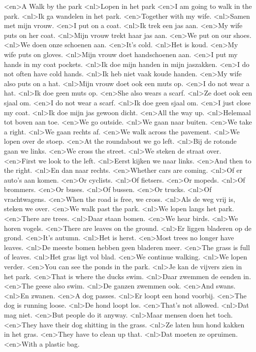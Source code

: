 <en>A Walk by the park
<nl>Lopen in het park
<en>I am going to walk in  the park.
<nl>Ik ga wandelen in het park.
<en>Together with my wife.
<nl>Samen met mijn vrouw.
<en>I put on a coat.
<nl>Ik trek een jas aan.
<en>My wife puts on her coat.
<nl>Mijn vrouw trekt haar jas aan.
<en>We put on our shoes.
<nl>We doen onze schoenen aan.
<en>It's cold.
<nl>Het is koud.
<en>My wife puts on gloves.
<nl>Mijn vrouw doet handschoenen aan.
<en>I put my hands in my coat pockets.
<nl>Ik doe mijn handen in mijn jaszakken.
<en>I do not often have cold hands.
<nl>Ik heb niet vaak koude handen.
<en>My wife also puts on a hat.
<nl>Mijn vrouw doet ook een muts op.
<en>I do not wear a hat.
<nl>Ik doe geen muts op.
<en>She also wears a scarf.
<nl>Ze doet ook een sjaal om.
<en>I do not wear a scarf.
<nl>Ik doe geen sjaal om.
<en>I just close my coat.
<nl>Ik doe mijn jas gewoon dicht.
<en>All the way up.
<nl>Helemaal tot boven aan toe.
<en>We go outside.
<nl>We gaan naar buiten.
<en>We take a right.
<nl>We gaan rechts af.
<en>We walk across the pavement.
<nl>We lopen over de stoep.
<en>At the roundabout we go left.
<nl>Bij de rotonde gaan we links.
<en>We cross the street.
<nl>We steken de straat over.
<en>First we look to the left.
<nl>Eerst kijken we naar links.
<en>And then to the right.
<nl>En dan naar rechts.
<en>Whether cars are coming.
<nl>Of er auto's aan komen.
<en>Or cyclists.
<nl>Of fietsers.
<en>Or mopeds.
<nl>Of brommers.
<en>Or buses.
<nl>Of bussen.
<en>Or trucks.
<nl>Of vrachtwagens.
<en>When the road is free, we cross.
<nl>Als de weg vrij is, steken we over.
<en>We walk past the park.
<nl>We lopen langs het park.
<en>There are trees.
<nl>Daar staan bomen.
<en>We hear birds.
<nl>We horen vogels.
<en>There are leaves on the ground.
<nl>Er liggen bladeren op de grond.
<en>It's autumn.
<nl>Het is herst.
<en>Most trees no longer have leaves.
<nl>De meeste bomen hebben geen bladeren meer.
<en>The grass is full of leaves.
<nl>Het gras ligt vol blad.
<en>We continue walking.
<nl>We lopen verder.
<en>You can see the ponds in the park.
<nl>Je kan de vijvers zien in het park.
<en>That is where the ducks swim.
<nl>Daar zwemmen de eenden in.
<en>The geese also swim.
<nl>De ganzen zwemmen ook.
<en>And swans.
<nl>En zwanen.
<en>A dog passes.
<nl>Er loopt een hond voorbij.
<en>The dog is running loose.
<nl>De hond loopt los.
<en>That's not allowed.
<nl>Dat mag niet.
<en>But people do it anyway.
<nl>Maar mensen doen het toch.
<en>They have their dog shitting in the grass.
<nl>Ze laten hun hond kakken in het gras.
<en>They have to clean up that.
<nl>Dat moeten ze opruimen.
<en>With a plastic bag.
